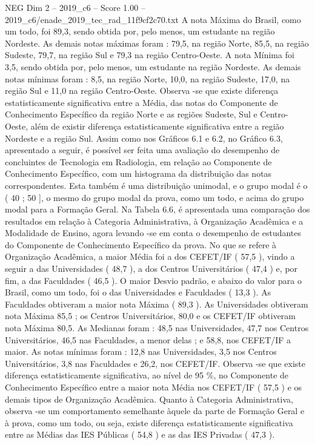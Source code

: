 \begin{textsample}{NEG Dim 2 – 2019\_c6 – Score 1.00 – 2019\_c6/enade\_2019\_tec\_rad\_11f9cf2c70.txt}
A nota Máxima do Brasil, como um todo, foi 89,3, sendo obtida por, pelo menos, um estudante na região Nordeste.
As demais notas máximas foram : 79,5, na região Norte, 85,5, na região Sudeste, 79,7, na região Sul e 79,3 na região Centro-Oeste.
A nota Mínima foi 3,5, sendo obtida por, pelo menos, um estudante na região Nordeste.
As demais notas mínimas foram : 8,5, na região Norte, 10,0, na região Sudeste, 17,0, na região Sul e 11,0 na região Centro-Oeste.
Observa -se que existe diferença estatisticamente significativa entre a Média, das notas do Componente de Conhecimento Específico da região Norte e as regiões Sudeste, Sul e Centro-Oeste, além de existir diferença estatisticamente significativa entre a região Nordeste e a região Sul.
Assim como nos Gráficos 6.1 e 6.2, no Gráfico 6.3, apresentado a seguir, é possível ser feita uma avaliação do desempenho de concluintes de Tecnologia em Radiologia, em relação ao Componente de Conhecimento Específico, com um histograma da distribuição das notas correspondentes.
Esta também é uma distribuição unimodal, e o grupo modal é o ( 40 ; 50 ], o mesmo do grupo modal da prova, como um todo, e acima do grupo modal para a Formação Geral.
Na Tabela 6.6, é apresentada uma comparação dos resultados em relação à Categoria Administrativa, à Organização Acadêmica e a Modalidade de Ensino, agora levando -se em conta o desempenho de estudantes do Componente de Conhecimento Específico da prova.
No que se refere à Organização Acadêmica, a maior Média foi a dos CEFET/IF ( 57,5 ), vindo a seguir a das Universidades ( 48,7 ), a dos Centros Universitários ( 47,4 ) e, por fim, a das Faculdades ( 46,5 ).
O maior Desvio padrão, e abaixo do valor para o Brasil, como um todo, foi o das Universidades e Faculdades ( 13,3 ).
As Faculdades obtiveram a maior nota Máxima ( 89,3 ).
As Universidades obtiveram nota Máxima 85,5 ; os Centros Universitários, 80,0 e os CEFET/IF obtiveram nota Máxima 80,5.
As Medianas foram : 48,5 nas Universidades, 47,7 nos Centros Universitários, 46,5 nas Faculdades, a menor delas ; e 58,8, nos CEFET/IF a maior.
As notas mínimas foram : 12,8 nas Universidades, 3,5 nos Centros Universitários, 3,8 nas Faculdades e 26,2, nos CEFET/IF.
Observa -se que existe diferença estatisticamente significativa, ao nível de 95 \%, no Componente de Conhecimento Específico entre a maior nota Média nos CEFET/IF ( 57,5 ) e os demais tipos de Organização Acadêmica.
Quanto à Categoria Administrativa, observa -se um comportamento semelhante àquele da parte de Formação Geral e à prova, como um todo, ou seja, existe diferença estatisticamente significativa entre as Médias das IES Públicas ( 54,8 ) e as das IES Privadas ( 47,3 ).

\end{textsample}
